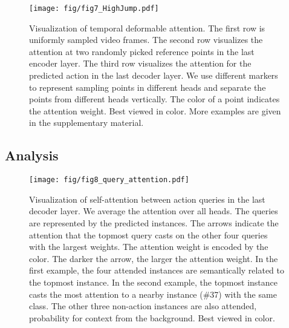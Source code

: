 \documentclass[lettersize,journal]{IEEEtran}
\begin{document}
\begin{figure*}
    \centering
\texttt{[image: fig/fig7\_HighJump.pdf]}
\label{fig:attention:futsal}
\caption{Visualization of temporal deformable attention. The first row is uniformly sampled video frames. The second row visualizes the attention at two randomly picked reference points in the last encoder layer. The third row visualizes the attention for the predicted action in the last decoder layer. We use different markers to represent sampling points in different heads and separate the points from different heads vertically. The color of a point indicates the attention weight. Best viewed in color. More examples are given in the supplementary material.}
\label{fig:attention_vis}
\end{figure*}


\subsection{Analysis}
\label{subsec:exp:analysis}


\begin{figure}
    \centering
    \texttt{[image: fig/fig8\_query\_attention.pdf]}
    \caption{Visualization of self-attention between action queries in the last decoder layer. We average the attention over all heads. The queries are represented by the predicted instances. The arrows indicate the attention that the topmost query casts on the other four queries with the largest weights. The attention weight is encoded by the color. The darker the arrow, the larger the attention weight. In the first example, the four attended instances are semantically related to the topmost instance. In the second example, the topmost instance casts the most attention to a nearby instance (\#37) with the same class. The other three non-action instances are also attended, probability for context from the background. Best viewed in color.}
    \label{fig:dec_self_att}
\end{figure}
\end{document}
